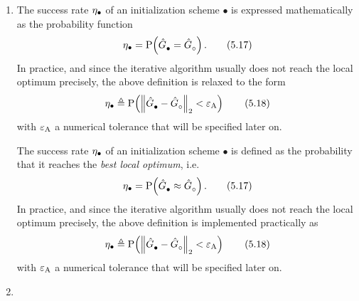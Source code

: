 \documentclass{responseletter}
\begin{document}
\begin{enumerate}
\item {}
\begin{oldquote}
The success rate $\successRate_{\bullet}$ of an initialization scheme $\bullet$ is expressed mathematically as the probability function
\begin{equation}
\successRate_{\bullet} = 
  \Prob{  \model{\bullet}=\model{\trueSymbol}  }
\text{.}
\tag{5.17}
\end{equation}
In practice, and since the iterative algorithm usually does not reach the local optimum precisely, the above definition is relaxed to the form
\begin{equation}
\successRate_{\bullet} \isdef \Prob{ \norm[2]{\model{\bullet} - \model{\trueSymbol}} < \absoluteTolerance}
\tag{5.18}
\end{equation}
with $\absoluteTolerance$ a numerical tolerance that will be specified later on.
\end{oldquote}

\begin{newquote}
The success rate $\successRate_{\bullet}$ of an initialization scheme $\bullet$ is defined as the probability that it reaches the \emph{best local optimum}, i.e.
\begin{equation}
\successRate_{\bullet} = 
  \Prob{  \model{\bullet} \approx \model{\trueSymbol}  }
\text{.}
\tag{5.17}
\end{equation}
In practice, and since the iterative algorithm usually does not reach the local optimum precisely, the above definition is implemented practically as
\begin{equation}
\successRate_{\bullet} \isdef \Prob{ \norm[2]{\model{\bullet} - \model{\trueSymbol}} < \absoluteTolerance}
\tag{5.18}
\end{equation}
with $\absoluteTolerance$ a numerical tolerance that will be specified later on.
\end{newquote}

\item {}


\end{enumerate}
\end{document}
